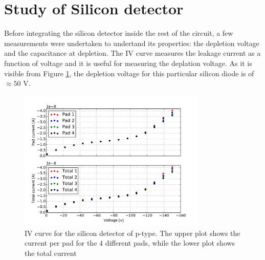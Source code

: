 \documentclass[12pt]{article}
\begin{document}
\section{Study of Silicon detector}

Before integrating the silicon detector inside the rest of the circuit, a few measurements were undertaken to undertand its properties: the depletion voltage and the capacitance at depletion. The IV curve measures the leakage current as a function of voltage and it is useful for measuring the deplation voltage. As it is visible from Figure \ref{fig:IVcurve}, the depletion voltage for this particular silicon diode is of $\approx 50$ V.

\begin{figure}[htb]
  \centering
  \includegraphics[width=0.8\textwidth]{./graphics/IV_V_vs_A.pdf}
  \caption{IV curve for the silicon detector of p-type. The upper plot shows the current per pad for the $4$ different pads, while the lower plot shows the total current }
  \label{fig:IVcurve}
\end{figure}
\end{document}
